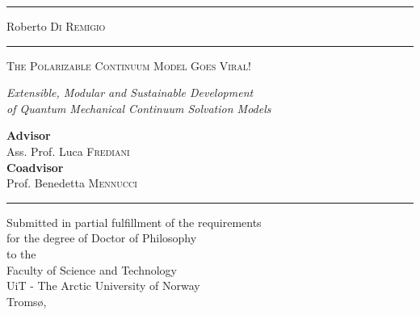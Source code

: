 
\begin{titlepage}
  \begingroup%
  \textheight
  \begin{minipage}[t]{0.05\textwidth}
    \color{myBlue}
    \rule{6pt}{\textheight}
  \end{minipage}
  \hspace{0.05\textwidth}
  \begin{minipage}[t]{0.8\textwidth}
    \vspace*{0.5\drop}
    {\LARGE Roberto \textsc{Di Remigio}} \\
    \rule{\textwidth}{1pt} \par
    \vspace{3\baselineskip}
    {\noindent\Huge\color{myBlue}\scshape
    The Polarizable Continuum Model Goes Viral!} \par
    \vspace{2\baselineskip}
    {\Large\itshape Extensible, Modular and Sustainable Development
    \\
    of Quantum Mechanical Continuum Solvation Models} \par
    \vspace{6.5\baselineskip}
    {
    \large \textbf{Advisor}
    \\
    Ass. Prof. Luca \textsc{Frediani}
    \\[0.1\drop]
    \textbf{Coadvisor}
    \\
    Prof. Benedetta \textsc{Mennucci}
    } \par
    \vspace{\baselineskip}
    \rule{\textwidth}{1pt} \par
    {\small\itshape
    \begin{center}
      Submitted in partial fulfillment of the requirements
      \\
      for the degree of Doctor of Philosophy
      \\[0.1\drop]
      \textnormal{to the}
      \\[0.1\drop]
      Faculty of Science and Technology
      \\
      UiT - The Arctic University of Norway
      \\
      Tromsø, \myTime
    \end{center}
    }
  \end{minipage}
  \endgroup
\end{titlepage}
\restoregeometry
